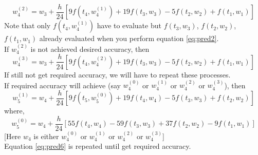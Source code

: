 \documentclass[../main-sheet.tex]{subfiles}
\begin{document}
\begin{equation}
    w_{4}^{(2)}=w_3+\frac{h}{24}\left[ 9f(t_{4},w_{4}^{(1)})+19f(t_{3},w_{3})-5f(t_{2},w_{2})+f(t_{1},w_{1}) \right]\label{eq:pred4}
\end{equation}
Note that only \(f(t_4,w_4^{(1)})\) have to evaluate but \(f(t_3,w_3)\), \(f(t_2,w_2)\), \(f(t_1,w_1)\) already evaluated when you perform equation \eqref{eq:pred2}.\\
If \(w_4^{(2)}\) is not achieved desired accuracy, then 
\begin{equation}
    w_{4}^{(3)}=w_3+\frac{h}{24}\left[ 9f(t_{4},w_{4}^{(2)})+19f(t_{3},w_{3})-5f(t_{2},w_{2})+f(t_{1},w_{1}) \right]\label{eq:pred5}
\end{equation}
If still not get required accuracy, we will have to repeat these processes.\\
If required accuracy will achieve (say \(w_4^{(0)}\) or \(w_4^{(1)}\) or \(w_4^{(2)}\) or \(w_4^{(3)}\)), then 
\begin{equation}
    w_{5}^{(1)}=w_4+\frac{h}{24}\left[ 9f(t_{5},w_{5}^{(0)})+19f(t_{4},w_{4})-5f(t_{3},w_{3})+f(t_{2},w_{2}) \right]\label{eq:pred6}
\end{equation}
where,
\begin{equation}
    w_{5}^{(0)}=w_4+\frac{h}{24}\left[ 55f(t_4,w_4)-59f(t_{3},w_{3})+37f(t_{2},w_{2})-9f(t_{1},w_{1}) \right]\label{eq:pred7}
\end{equation}
[Here \(w_4\) is either \(w_4^{(0)}\) or \(w_4^{(1)}\) or \(w_4^{(2)}\) or \(w_4^{(3)}\)]\\
Equation \eqref{eq:pred6} is repeated until get required accuracy.
\end{document}
